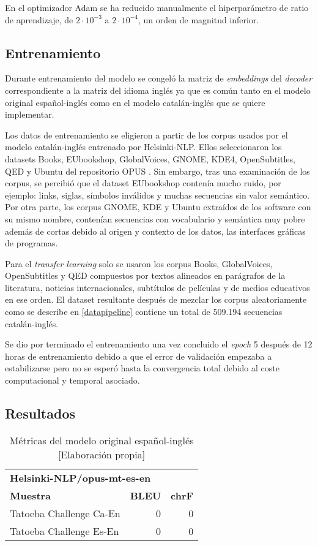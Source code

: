 En el optimizador Adam \cite{Kingma2014Dec} se ha reducido manualmente el hiperparámetro de ratio de aprendizaje, de $2\cdot 10^{-3}$ a $2\cdot 10^{-4}$, un orden de magnitud inferior.


\subsection{Entrenamiento}
Durante entrenamiento del modelo se congeló la matriz de \textit{embeddings} del \textit{decoder} correspondiente a la matriz del idioma inglés ya que es común tanto en el modelo original español-inglés como en el modelo catalán-inglés que se quiere implementar.

Los datos de entrenamiento se eligieron a partir de los corpus usados por el modelo catalán-inglés entrenado por Helsinki-NLP. Ellos seleccionaron los datasets Books, EUbookshop, GlobalVoices, GNOME, KDE4, OpenSubtitles, QED y Ubuntu del repositorio OPUS \cite{CORPUS}. Sin embargo, tras una examinación de los corpus, se percibió que el dataset EUbookshop contenía mucho ruido, por ejemplo: links, siglas, símbolos inválidos y muchas secuencias sin valor semántico. Por otra parte, los corpus GNOME, KDE y Ubuntu extraídos de los software con su mismo nombre, contenían secuencias con vocabulario y semántica muy pobre además de cortas debido al origen y contexto de los datos, las interfaces gráficas de programas.

Para el \textit{transfer learning} solo se usaron los corpus Books, GlobalVoices, OpenSubtitles y QED compuestos por textos alineados en parágrafos de la literatura, noticias internacionales, subtítulos de películas y de medios educativos en ese orden.
El dataset resultante después de mezclar los corpus aleatoriamente como se describe en \ref{datapipeline} contiene un total de 509.194 secuencias catalán-inglés.

Se dio por terminado el entrenamiento una vez concluido el \textit{epoch} 5 después de 12 horas de entrenamiento debido a que el error de validación empezaba a estabilizarse pero no se esperó hasta la convergencia total debido al coste computacional y temporal asociado.

\subsection{Resultados}
\begin{table}[H]
    \begin{center}
        \begin{tabular}{ l r r }
        \multicolumn{3}{l}{\textbf{Helsinki-NLP/opus-mt-es-en}}\\
        \textbf{Muestra} & \textbf{BLEU} & \textbf{chrF} \\
        Tatoeba Challenge Ca-En & 0 & 0 \\
        Tatoeba Challenge Es-En & 0 & 0
        \end{tabular}
        \caption{Métricas del modelo original español-inglés [Elaboración propia]}\label{transferorigesen}
    \end{center}
\end{table}

